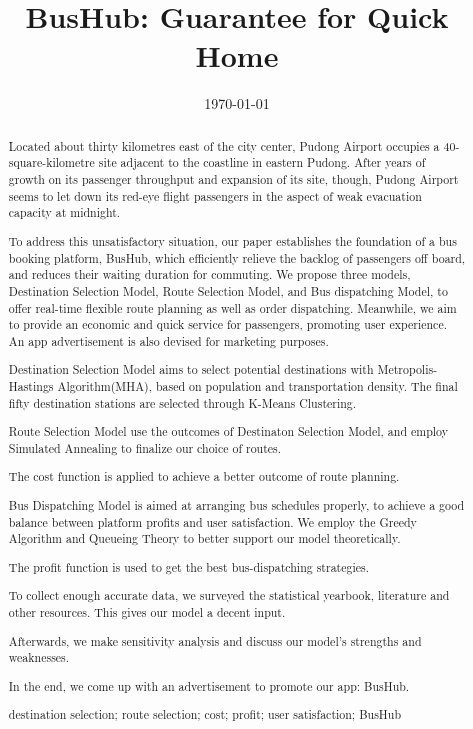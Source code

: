 \documentclass{mcmthesis}
\begin{document}
\linespread{0.6} %
\setlength{\parskip}{0.5\baselineskip} %
\title{BusHub: Guarantee for Quick Home}

\date{\today}
	\begin{abstract}
	
     Located about thirty kilometres east of the city center, Pudong Airport
     occupies a 40-square-kilometre site adjacent to the coastline
     in eastern Pudong. After years of growth on its passenger throughput and expansion of its site, though, Pudong Airport seems to let down its red-eye flight passengers in the aspect of weak evacuation capacity  at midnight.
     
     To address this unsatisfactory situation, our paper establishes the foundation of a bus booking platform, BusHub, which efficiently relieve the backlog of passengers off board, and reduces their waiting duration for commuting. We propose three models, Destination Selection Model, Route Selection Model, and Bus dispatching Model, to offer real-time flexible route planning as well as order dispatching. Meanwhile, we aim to provide an economic and quick service for passengers, promoting user experience. An app advertisement is also devised for marketing purposes.
     
     Destination Selection Model aims to select potential destinations with Metropolis-Hastings Algorithm(MHA), based on population and transportation density. The final fifty destination stations are selected through K-Means Clustering. 
     
     Route Selection Model use the outcomes of Destinaton Selection Model, and employ Simulated Annealing to finalize our choice of routes.

     The cost function is applied to achieve a better outcome of route planning.
     
     Bus Dispatching Model is aimed at arranging bus schedules properly, to achieve a good balance between platform profits and user satisfaction. We employ the Greedy Algorithm and Queueing Theory to better support our model theoretically.

	 The profit function is used to get the best bus-dispatching strategies.
	 
	 To collect enough accurate data, we surveyed the statistical yearbook, literature and other resources. This gives our model a decent input.
	
	 Afterwards, we make sensitivity analysis and discuss our model's strengths and weaknesses.
	 
	 In the end, we come up with an advertisement to promote our app: BusHub.
	
		\begin{keywords}
		destination selection; route selection; cost; profit; user satisfaction; BusHub
		\end{keywords}
	\end{abstract}
\end{document}
